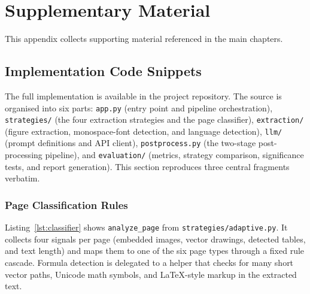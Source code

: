 \chapter{Supplementary Material}

This appendix collects supporting material referenced in the main chapters.

\section{Implementation Code Snippets}
\label{sec:code_snippets}

The full implementation is available in the project repository. The source is
organised into six parts: \texttt{app.py} (entry point and pipeline
orchestration), \texttt{strategies/} (the four extraction strategies and the
page classifier), \texttt{extraction/} (figure extraction, monospace-font
detection, and language detection), \texttt{llm/} (prompt definitions and API
client), \texttt{postprocess.py} (the two-stage post-processing pipeline), and
\texttt{evaluation/} (metrics, strategy comparison, significance tests, and
report generation). This section reproduces three central fragments verbatim.

\subsection{Page Classification Rules}

Listing~\ref{lst:classifier} shows \texttt{analyze\_page} from
\texttt{strategies/adaptive.py}. It collects four signals per page (embedded
images, vector drawings, detected tables, and text length) and maps them to
one of the six page types through a fixed rule cascade. Formula detection is
delegated to a helper that checks for many short vector paths, Unicode math
symbols, and LaTeX-style markup in the extracted text.

